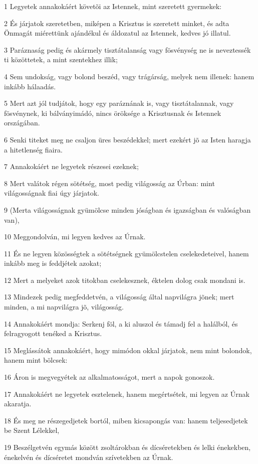\par 1 Legyetek annakokáért követõi az Istennek, mint szeretett gyermekek:
\par 2 És járjatok szeretetben, miképen a Krisztus is szeretett minket, és adta Önmagát miérettünk ajándékul és áldozatul az Istennek, kedves jó illatul.
\par 3 Paráznaság pedig és akármely tisztátalanság vagy fösvénység ne is neveztessék ti közöttetek, a mint szentekhez illik;
\par 4 Sem undokság, vagy bolond beszéd, vagy trágárság, melyek nem illenek: hanem inkább hálaadás.
\par 5 Mert azt jól tudjátok, hogy egy paráznának is, vagy tisztátalannak, vagy fösvénynek, ki bálványimádó, nincs öröksége a Krisztusnak és Istennek országában.
\par 6 Senki titeket meg ne csaljon üres beszédekkel; mert ezekért jõ az Isten haragja a hitetlenség fiaira.
\par 7 Annakokáért ne legyetek részesei ezeknek;
\par 8 Mert valátok régen sötétség, most pedig világosság az Úrban: mint világosságnak fiai úgy járjatok.
\par 9 (Merta világosságnak gyümölcse minden jóságban és igazságban és valóságban van),
\par 10 Meggondolván, mi legyen kedves az Úrnak.
\par 11 És ne legyen közösségtek a sötétségnek gyümölcstelen cselekedeteivel, hanem inkább meg is feddjétek azokat;
\par 12 Mert a melyeket azok titokban cselekesznek, éktelen dolog csak mondani is.
\par 13 Mindezek pedig megfeddetvén, a világosság által napvilágra jõnek; mert minden, a mi napvilágra jõ, világosság.
\par 14 Annakokáért mondja: Serkenj föl, a ki aluszol és támadj fel a halálból, és felragyogott tenéked a Krisztus.
\par 15 Meglássátok annakokáért, hogy mimódon okkal járjatok, nem mint bolondok, hanem mint bölcsek:
\par 16 Áron is megvegyétek az alkalmatosságot, mert a napok gonoszok.
\par 17 Annakokáért ne legyetek esztelenek, hanem megértsétek, mi legyen az Úrnak akaratja.
\par 18 És meg ne részegedjetek bortól, miben kicsapongás van: hanem teljesedjetek be Szent Lélekkel,
\par 19 Beszélgetvén egymás között zsoltárokban és dícséretekben és lelki énekekben, énekelvén és dícséretet mondván szívetekben az Úrnak.

